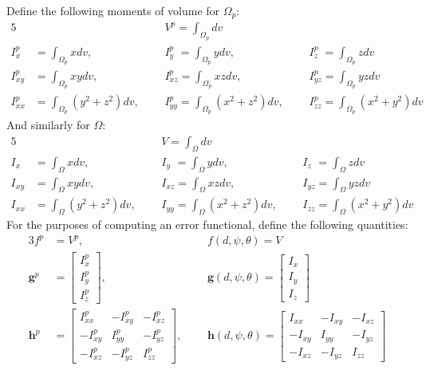 Define the following moments of volume for $\Omega_p$:
\begin{alignat}{5}
&{} &&V^p = \int_{\Omega_p}dv &&{} \\
I_{x\phantom{z}}^p &= \int_{\Omega_p}xdv, &&I_{y\phantom{z}}^p = \int_{\Omega_p}ydv, &&I_{z\phantom{z}}^p = \int_{\Omega_p}zdv \\
I^p_{xy} &= \int_{\Omega_p}xydv, &&I^p_{xz} = \int_{\Omega_p}xzdv, &&I^p_{yz} = \int_{\Omega_p}yzdv \\
I^p_{xx} &= \int_{\Omega_p}(y^2 + z^2)dv, \text{\ \ \ \ \ \ }&&I^p_{yy} = \int_{\Omega_p}(x^2 + z^2)dv, \text{\ \ \ \ \ \ }&&I^p_{zz} = \int_{\Omega_p}(x^2 + y^2)dv
\end{alignat}
And similarly for $\Omega$:
\begin{alignat}{5}
&{} &&V = \int_{\Omega}dv &&{} \\
I_{x\phantom{z}} &= \int_{\Omega}xdv, &&I_{y\phantom{z}} = \int_{\Omega}ydv, &&I_{z\phantom{z}} = \int_{\Omega}zdv \\
I_{xy} &= \int_{\Omega}xydv, &&I_{xz} = \int_{\Omega}xzdv, &&I_{yz} = \int_{\Omega}yzdv \\
I_{xx} &= \int_{\Omega}(y^2 + z^2)dv, \text{\ \ \ \ \ \ }&&I_{yy} = \int_{\Omega}(x^2 + z^2)dv, \text{\ \ \ \ \ \ }&&I_{zz} = \int_{\Omega}(x^2 + y^2)dv
\end{alignat}
For the purposes of computing an error functional, define the following quantities:
\begin{alignat}{3}
f^p &= V^p, \text{\ \ \ \ \ }&&f(d,\psi,\theta) = V \\
\bm{g}^p &= \left[\begin{array} {ccc} {I_x^p} \\ {I_y^p} \\ {I_z^p} \end{array} \right], \text{\ \ \ \ \ }&&\bm{g}(d,\psi,\theta) = \left[\begin{array} {ccc} {I_x} \\ {I_y} \\ {I_z} \end{array} \right] \\
\bm{h}^p &= \left[\begin{array} {ccc} {I_{xx}^p} & {-I_{xy}^p} & {-I_{xz}^p}\\ {-I_{xy}^p} & {I_{yy}^p} & {-I_{yz}^p} \\ -{I_{xz}^p} & {-I_{yz}^p} & {I_{zz}^p} \end{array} \right],\text{\ \ \ \ \ \ \ }&&\bm{h}(d,\psi,\theta) = \left[\begin{array} {ccc} {I_{xx}} & {-I_{xy}} & {-I_{xz}}\\ {-I_{xy}} & {I_{yy}} & {-I_{yz}} \\ -{I_{xz}} & {-I_{yz}} & {I_{zz}} \end{array} \right]
\end{alignat}
